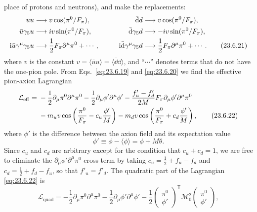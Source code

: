 place of protons and neutrons), and make the replacements:
\begin{alignat}{2}
\bar u u&\longrightarrow v\cos(\pi^0/F_\pi),\qquad&
\bar {\mathop{}\!\mathrm{d}} d&\longrightarrow v\cos(\pi^0/F_\pi),
\notag\\
\bar u\gamma_5u&\longrightarrow iv\sin(\pi^0/F_\pi),&
\bar {\mathop{}\!\mathrm{d}}\gamma_5d&\longrightarrow-iv\sin(\pi^0/F_\pi),
\notag\\
\mathrm{i}\bar u\gamma^\mu\gamma_5u&\longrightarrow
\frac12F_\pi\partial^\mu\pi^0+\cdots,\qquad&
\mathrm{i}\bar {\mathop{}\!\mathrm{d}}\gamma^\mu\gamma_5d&\longrightarrow
\frac12F_\pi\partial^\mu\pi^0+\cdots.
\tag{23.6.21}\label{eq:23.6.21}
\end{alignat}
where $v$ is the constant $v=\langle\bar u u\rangle=\langle\bar \dd \dd\rangle$,
and ``$\cdots$'' denotes terms that do not have the one-pion pole. From
Eqs.~\eqref{eq:23.6.19} and \eqref{eq:23.6.20} we find the effective
pion-axion Lagrangian
\begin{align}
\mathcal L_{\mathrm{eff}}={}&
-\frac12\partial_\mu\pi^0\partial^\mu\pi^0
-\frac12\partial_\mu\phi'\partial^\mu\phi'
-\frac{f'_u-f'_d}{2M}F_\pi
\partial_\mu\phi'\partial^\mu\pi^0
\notag\\
&-m_uv\cos\left(\frac{\pi^0}{F_\pi}-c_u\frac{\phi'}{M}\right)
-m_dv\cos\left(\frac{\pi^0}{F_\pi}+c_d\frac{\phi'}{M}\right),
\tag{23.6.22}\label{eq:23.6.22}
\end{align}
where $\phi'$ is the difference between the axion field and its
expectation value
\begin{equation}
\phi'\equiv\phi-\langle\phi\rangle=\phi+M\theta.
\tag{23.6.23}\label{eq:23.6.23}
\end{equation}
Since $c_u$ and $c_d$ are arbitrary except for the condition that
$c_u+c_d=1$, we are free to eliminate the
$\partial_\mu\phi'\partial^\mu\pi^0$ cross term by taking
$c_u=\frac12+f_u-f_d$ and $c_d=\frac12+f_d-f_u$, so that
$f'_u=f'_d$. The quadratic part of the Lagrangian \eqref{eq:23.6.22} is
\begin{equation}
\mathcal L_{\mathrm{quad}}=
-\frac12\partial_\mu\pi^0\partial^\mu\pi^0
-\frac12\partial_\mu\phi'\partial^\mu\phi'
-\frac12
\begin{pmatrix}\pi^0\\\phi'\end{pmatrix}^{\mathsf T}
\mathcal M_0^2
\begin{pmatrix}\pi^0\\\phi'\end{pmatrix},
\tag{23.6.24}\label{eq:23.6.24}
\end{equation}
